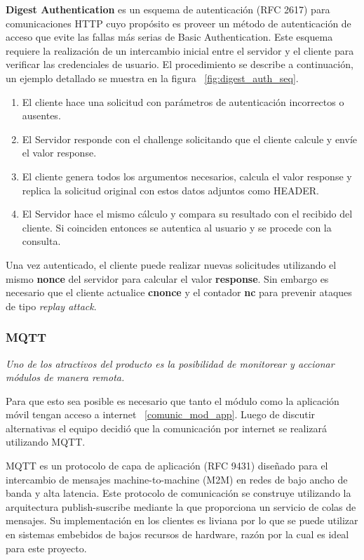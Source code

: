 \textbf{Digest Authentication} es un esquema de autenticación (RFC 2617) para comunicaciones HTTP cuyo propósito es proveer un método de autenticación de acceso que evite las fallas más serias de Basic Authentication.
Este esquema requiere la realización de un intercambio inicial entre el servidor y el cliente para verificar las credenciales de usuario. El procedimiento se describe a continuación, un ejemplo detallado se muestra en la figura ~\ref{fig:digest_auth_seq}.
\begin{enumerate}
	\item El cliente hace una solicitud con parámetros de autenticación incorrectos o ausentes.
	\item El Servidor responde con el challenge solicitando que el cliente calcule y envíe el valor  response.
	\item El cliente genera todos los argumentos necesarios, calcula el valor response y replica la solicitud original con estos datos adjuntos como HEADER.
	\item El Servidor hace el mismo cálculo y compara su resultado con el recibido del cliente. Si coinciden entonces se autentica al usuario y se procede con la consulta.
\end{enumerate}

Una vez autenticado, el cliente puede realizar nuevas solicitudes utilizando el mismo \textbf{nonce} del servidor para calcular el valor \textbf{response}. Sin embargo es necesario que el cliente actualice \textbf{cnonce} y el contador \textbf{nc} para prevenir ataques de tipo \emph{replay attack}. 

\subsubsection{MQTT}
\label{section:mqtt}
\emph{Uno de los atractivos del producto es la posibilidad de monitorear y accionar módulos de manera remota.}

Para que esto sea posible es necesario que tanto el módulo como la aplicación móvil tengan acceso a internet ~\ref{comunic_mod_app}. Luego de discutir alternativas el equipo decidió que la comunicación por internet se realizará utilizando  MQTT.

MQTT es un protocolo de capa de aplicación (RFC 9431) diseñado para el intercambio de mensajes machine-to-machine (M2M) en redes de bajo ancho de banda y alta latencia. Este protocolo de comunicación se construye utilizando la arquitectura publish-suscribe mediante la que proporciona un servicio de colas de mensajes. Su implementación en los clientes es liviana por lo que se puede utilizar en sistemas embebidos de bajos recursos de hardware, razón por la cual es ideal para este proyecto.

